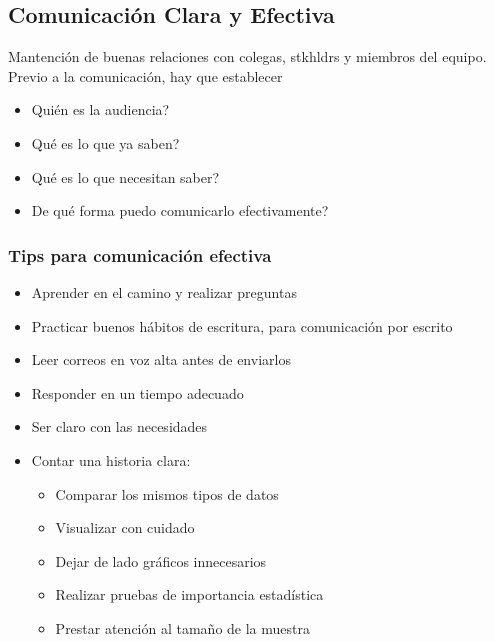 \subsection{Comunicación Clara y Efectiva}
Mantención de buenas relaciones con colegas, \gls{stkhldrs} y miembros del equipo. Previo a la comunicación, hay que establecer
\begin{itemize}
    \item{Quién es la audiencia?}
    \item{Qué es lo que ya saben?}
    \item{Qué es lo que necesitan saber?}
    \item{De qué forma puedo comunicarlo efectivamente?}
\end{itemize}

\subsubsection{Tips para comunicación efectiva}
\begin{itemize}
    \item {Aprender en el camino y realizar preguntas}
    \item {Practicar buenos hábitos de escritura, para comunicación por escrito}
    \item {Leer correos en voz alta antes de enviarlos}
    \item {Responder en un tiempo adecuado}
    \item {Ser claro con las necesidades}
    \item {Contar una historia clara: 
    \begin{itemize}
        \item {Comparar los mismos tipos de datos}
        \item {Visualizar con cuidado}
        \item {Dejar de lado gráficos innecesarios}
        \item {Realizar pruebas de importancia estadística}
        \item {Prestar atención al tamaño de la muestra}
    \end{itemize}}
\end{itemize}

